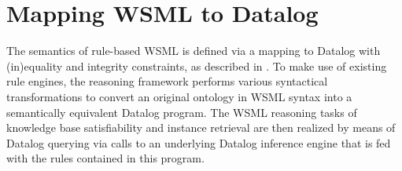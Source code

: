 \newcommand{\smtxtit}[1]{\ensuremath{\textit{\scriptsize{#1}}}}
\newcommand{\trans}[1]{\ensuremath{\tau_{#1}}\xspace}
\newcommand{\transtxt}[1]{\trans{\smtxtit{#1}}}
\def\transax{\transtxt{axioms}}
\def\transnorm{\transtxt{norm}}
\def\translt{\transtxt{lt}}
\def\transdlog{\transtxt{datalog}}

\def\LE{\ensuremath{\mathcal{L\!E}}\xspace}
\def\O{\ensuremath{\mathcal{O}}\xspace}
\def\P{\ensuremath{\mathcal{P}}\xspace}
\newcommand{\powset}[1]{\ensuremath{2^{#1}}\xspace}
\def\lprl{\ensuremath{\;:\!-\:}}
\def\cstr{\ensuremath{\;!-\:}}
\def\qury{\ensuremath{\;?-\:}}
\def\dlogrule{\lprl}
\def\dlogcstr{\square\lprl}
\def\dlogand{\wedge}
\def\dlognot{\sim}
\newcommand{\dlogfact}[1]{\ensuremath{{#1}\;.}}

\newcommand{\predicate}[1]{\ensuremath{p_{#1}}\xspace}
\newcommand{\predsubtxt}[1]{\mathrm{\sf #1}}
\def\psco{\predicate{\predsubtxt{sco}}}
\def\pmo{\predicate{\predsubtxt{mo}}}
\def\phval{\predicate{\predsubtxt{hval}}}
\def\pitype{\predicate{\predsubtxt{itype}}}
\def\potype{\predicate{\predsubtxt{otype}}}
\def\mlaxioms{\ensuremath{P_{\smtxtit{meta}}}\xspace}

\newcommand{\typeof}{\ensuremath{\textit{typeOf}}\xspace}

\def\bla{\textbf{{\sf bla}}\xspace}

\section{Mapping WSML to Datalog\label{sec:mapping}}

The semantics of rule-based WSML is defined via a mapping to
Datalog\cite{datalog} with (in)equality and integrity constraints,
as described in \cite{wsml-spec}. To make use of existing rule
engines, the reasoning framework performs various syntactical
transformations to convert an original ontology in WSML syntax
into a semantically equivalent Datalog program. The WSML reasoning
tasks of knowledge base satisfiability and instance retrieval are
then realized by means of Datalog querying via calls to an
underlying Datalog inference engine that is fed with the rules
contained in this program.





